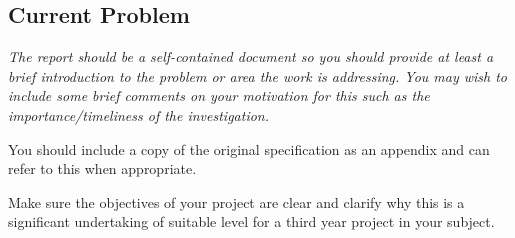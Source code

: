 
\subsection*{Current Problem}

\textit{The report should be a self-contained document so you should provide at least a brief introduction to the problem or area the work is addressing. You may wish to include some brief comments on your motivation for this such as the importance/timeliness of the investigation.}


You should include a copy of the original specification as an appendix and can refer to this when appropriate.

Make sure the objectives of your project are clear and clarify why this is a significant undertaking of suitable level for a third year project in your subject.

